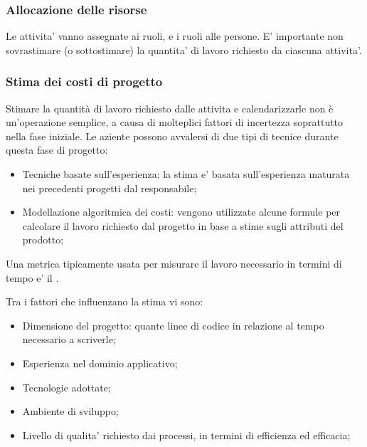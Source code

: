 

\subsubsection{Allocazione delle risorse}

Le attivita' vanno assegnate ai ruoli, e i ruoli alle persone. E' importante non
sovrastimare (o sottostimare) la quantita' di lavoro richiesto da ciascuna
attivita'.

\subsubsection{Stima dei costi di progetto}

Stimare la quantità di lavoro richiesto dalle attivita e calendarizzarle non è
un'operazione semplice, a causa di molteplici fattori di incertezza soprattutto
nella fase iniziale. Le aziente possono avvalersi di due tipi di tecnice durante
questa fase di progetto:

\begin{itemize}
  \item Tecniche basate sull'esperienza: la stima e' basata sull'esperienza
    maturata nei precedenti progetti dal responsabile;
  \item Modellazione algoritmica dei costi: vengono utilizzate alcune formule
    per calcolare il lavoro richiesto dal progetto in base a stime sugli
    attributi del prodotto;
\end{itemize}

Una \gls{metrica} tipicamente usata per misurare il lavoro necessario in termini
di tempo e' il .

Tra i fattori che influenzano la stima vi sono:

\begin{itemize}
  \item Dimensione del progetto: quante linee di codice in relazione al
    tempo necessario a scriverle;
  \item Esperienza nel dominio applicativo;
  \item Tecnologie adottate;
  \item Ambiente di sviluppo;
  \item Livello di qualita' richiesto dai processi, in termini di efficienza ed
    efficacia;
\end{itemize}

